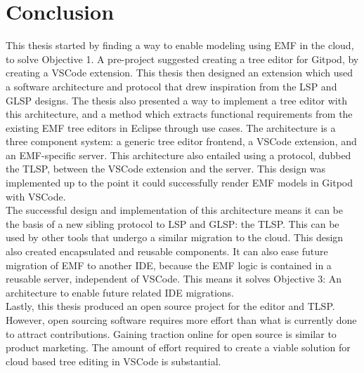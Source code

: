 \chapter{Conclusion}\label{chap:conclusion}

This thesis started by finding a way to enable modeling using \acrlong{EMF} in the \gls{cloud}, to solve Objective 1.
A pre-project suggested creating a tree editor for \gls{Gitpod}, by creating a \gls{VSCode} extension.
This thesis then designed an extension which used a software architecture and protocol that drew inspiration from the \acrlong{LSP} and \acrlong{GLSP} designs.
The thesis also presented a way to implement a tree editor with this architecture, and a method which extracts functional requirements from the existing \acrshort{EMF} tree editors in \gls{Eclipse} through use cases.
The architecture is a three component system: a generic tree editor frontend, a \gls{VSCode} extension, and an \acrshort{EMF}-specific server.
This architecture also entailed using a protocol, dubbed the \acrfull{TLSP}, between the \gls{VSCode} extension and the server.
This design was implemented up to the point it could successfully render \acrshort{EMF} models in \gls{Gitpod} with \gls{VSCode}.\\

The successful design and implementation of this architecture means it can be the basis of a new sibling protocol to \acrshort{LSP} and \acrshort{GLSP}: the \acrshort{TLSP}.
This can be used by other tools that undergo a similar migration to the \gls{cloud}. 
This design also created encapsulated and reusable components.
It can also ease future migration of \acrshort{EMF} to another \acrlong{IDE}, because the \acrshort{EMF} logic is contained in a reusable server, independent of \gls{VSCode}.
This means it solves Objective 3: An architecture to enable future related IDE migrations.\\

Lastly, this thesis produced an \gls{open source} project for the editor and \acrshort{TLSP}.
However, open sourcing software requires more effort than what is currently done to attract contributions.
Gaining traction online for \gls{open source} is similar to product marketing.
The amount of effort required to create a viable solution for \gls{cloud} based tree editing in \gls{VSCode} is substantial.

